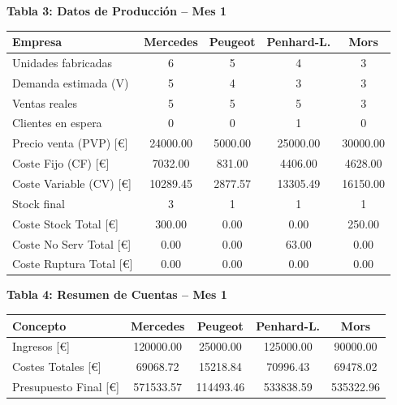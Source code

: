 \documentclass{standalone}
\begin{document}
%		
%	
%	
	\begin{minipage}{1.08\linewidth}
		\centering
		
		\textbf{Tabla 3: Datos de Producción – Mes 1}\\[0.5em]
		\begin{tabular}{@{}l
				S[table-format=2.0]
				S[table-format=2.0]
				S[table-format=2.0]
				S[table-format=2.0]@{}}
			\toprule
			\textbf{Empresa} & \textbf{Mercedes} & \textbf{Peugeot} & \textbf{Penhard-L.} & \textbf{Mors} \\
			\midrule
			Unidades fabricadas & 6 & 5 & 4 & 3 \\
			Demanda estimada (V) & 5 & 4 & 3 & 3 \\
			Ventas reales & 5 & 5 & 5 & 3 \\
			Clientes en espera & 0 & 0 & 1 & 0 \\
			Precio venta (PVP) [\euro] & 24000.00 & 5000.00 & 25000.00 & 30000.00 \\
			Coste Fijo (CF) [\euro] & 7032.00 & 831.00 & 4406.00 & 4628.00 \\
			Coste Variable (CV) [\euro] & 10289.45 & 2877.57 & 13305.49 & 16150.00 \\
			Stock final & 3 & 1 & 1 & 1 \\
			Coste Stock Total [\euro] & 300.00 & 0.00 & 0.00 & 250.00 \\
			Coste No Serv Total [\euro] & 0.00 & 0.00 & 63.00 & 0.00 \\
			Coste Ruptura Total [\euro] & 0.00 & 0.00 & 0.00 & 0.00 \\
			\bottomrule
		\end{tabular}
		
		\vspace{2em} %
		
		\textbf{Tabla 4: Resumen de Cuentas – Mes 1}\\[0.5em]
		\begin{tabular}{@{}l
				S[table-format=7.2]
				S[table-format=7.2]
				S[table-format=7.2]
				S[table-format=7.2]@{}}
			\toprule
			\textbf{Concepto} & \textbf{Mercedes} & \textbf{Peugeot} & \textbf{Penhard-L.} & \textbf{Mors} \\
			\midrule
			Ingresos [\euro] & 120000.00 & 25000.00 & 125000.00 & 90000.00 \\
			Costes Totales [\euro] & 69068.72 & 15218.84 & 70996.43 & 69478.02 \\
			Presupuesto Final [\euro] & 571533.57 & 114493.46 & 533838.59 & 535322.96 \\
			\bottomrule
		\end{tabular}
		
	\end{minipage}
\end{document}
